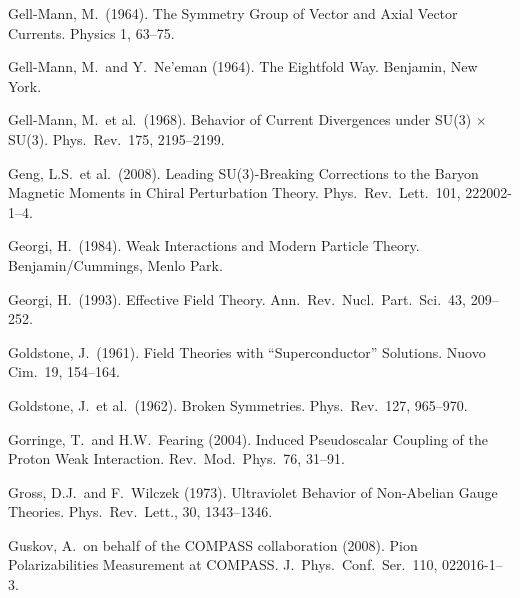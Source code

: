 \documentclass[twoside,12pt]{article}
\begin{document}
\begin{thebibliography}{}
Gell-Mann, M.~(1964). The Symmetry Group of Vector and Axial Vector Currents.
Physics 1, 63--75.

Gell-Mann, M.~and Y.~Ne'eman (1964).
The Eightfold Way.
Benjamin, New York.

Gell-Mann, M.~et al.~(1968).
Behavior of Current Divergences under SU(3) $\times$ SU(3).
Phys.\ Rev.\  175, 2195--2199.

Geng, L.S.~et al.~(2008).
Leading SU(3)-Breaking Corrections to the Baryon Magnetic Moments in Chiral
Perturbation Theory.
Phys.\ Rev.\ Lett.\ 101, 222002-1--4.


Georgi, H.~(1984).
Weak Interactions and Modern Particle Theory.
Benjamin/Cummings, Menlo Park.

Georgi, H.~(1993).
Effective Field Theory.
Ann.\ Rev.\ Nucl.\ Part.\ Sci.\ 43, 209--252.

Goldstone, J.~(1961).
Field Theories with ``Superconductor'' Solutions.
Nuovo Cim.\  19, 154--164.

Goldstone, J.~et al.~(1962).
Broken Symmetries.
Phys.\ Rev.\  127, 965--970.

Gorringe, T.~and H.W.~Fearing (2004).
Induced Pseudoscalar Coupling of the Proton Weak Interaction.
Rev.\ Mod.\ Phys.\ 76, 31--91.

Gross, D.J.~and F.~Wilczek (1973).
Ultraviolet Behavior of Non-Abelian Gauge Theories.
Phys.\ Rev.\ Lett., 30, 1343--1346.

Guskov, A.~on behalf of the COMPASS collaboration (2008).
Pion Polarizabilities Measurement at COMPASS.
J.\ Phys.\ Conf.\ Ser.\  110, 022016-1--3.


\end{thebibliography}
\end{document}
